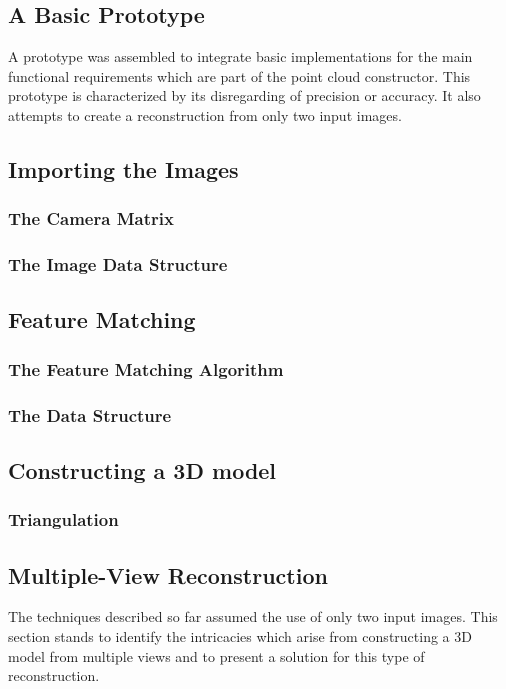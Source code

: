 \documentclass[12pt,a4paper,twoside,openright]{report}
\begin{document}
\subsection{A Basic Prototype}
A prototype was assembled to integrate basic implementations for the main functional requirements which are part of the point cloud constructor. This prototype is characterized by its disregarding of precision or accuracy. It also attempts to create a reconstruction from only two input images. 

\subsection{Importing the Images}
\subsubsection{The Camera Matrix}

\subsubsection{The Image Data Structure}

\subsection{Feature Matching}

\subsubsection{The Feature Matching Algorithm}

\subsubsection{The Data Structure}

\subsection{Constructing a 3D model}
\subsubsection{Triangulation}
\subsubsection{}

\subsection{Multiple-View Reconstruction}
The techniques described so far assumed the use of only two input images. This section stands to identify the intricacies which arise from constructing a 3D model from multiple views and to present a solution for this type of reconstruction.
\end{document}
